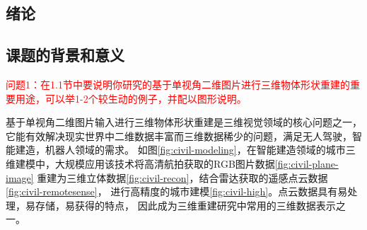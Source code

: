 \documentclass[bachelor, nocolorlinks, printoneside]{seuthesis} %
\newcommand\COMM[1]{\textcolor{red}{#1}}
\begin{document}
\begin{Main} %

\chapter{绪论}

\section{课题的背景和意义}
\COMM{问题1：在1.1节中要说明你研究的基于单视角二维图片进行三维物体形状重建的重要用途，可以举1-2个较生动的例子，并配以图形说明。}

基于单视角二维图片输入进行三维物体形状重建是三维视觉领域的核心问题之一，它能有效解决现实世界中二维数据丰富而三维数据稀少的问题，满足无人驾驶，智能建造，机器人领域的需求。
如图\ref{fig:civil-modeling}，在智能建造领域的城市三维建模中，大规模应用该技术将高清航拍获取的RGB图片数据\ref{fig:civil-plane-image}
重建为三维立体数据\ref{fig:civil-recon}，结合雷达获取的遥感点云数据\ref{fig:civil-remotesense}，
进行高精度的城市建模\ref{fig:civil-high}。点云数据具有易处理，易存储，易获得的特点，
因此成为三维重建研究中常用的三维数据表示之一。


\end{Main}
\end{document}
